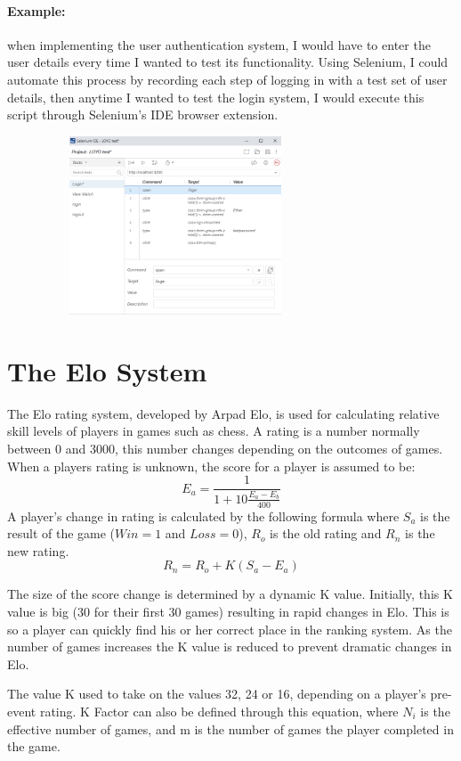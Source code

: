 \paragraph{Example:}when implementing the user authentication system, I would have to enter the user details every time I wanted to test its functionality. Using Selenium, I could automate this process by recording each step of logging in with a test set of user details, then anytime I wanted to test the login system, I would execute this script through Selenium's IDE browser extension.
\begin{center}
\includegraphics[width=10cm,height=5.3cm,keepaspectratio]{img/Selenium.png}
\end{center}
\section{The Elo System}
The Elo rating system, developed by Arpad Elo, is used for calculating relative skill levels of players in games such as chess.\cite{glickman1999rating} A rating is a number normally between 0 and 3000, this number changes depending on the outcomes of games. When a players rating is unknown, the score for a player is assumed to be:
\[ E_a = \frac{1}{1+10\frac{E_a-E_b}{400}} \] \cite{pelanek2014application} A player's change in rating is calculated by the following formula where ${S_a}$ is the result of the game (${Win = 1}$ and $Loss = 0$), $R_o$ is the old rating and $R_n$ is the new rating.
\[ R_n = R_o + K(S_a - E_a) \]


{\raggedright The size of the score change is determined by a dynamic K value. Initially, this K value is big (30 for their first 30 games) resulting in rapid changes in Elo. This is so a player can quickly find his or her correct place in the ranking system. As the number of games increases the K value is reduced to prevent dramatic changes in Elo.}\newline
\cite{glickmanrating} The value K used to take on the values 32, 24 or 16, depending on a player’s pre-event rating. K Factor can also be defined through this equation, where $N_i$ is the effective number of games, and m is the number of games the player completed in the game.
